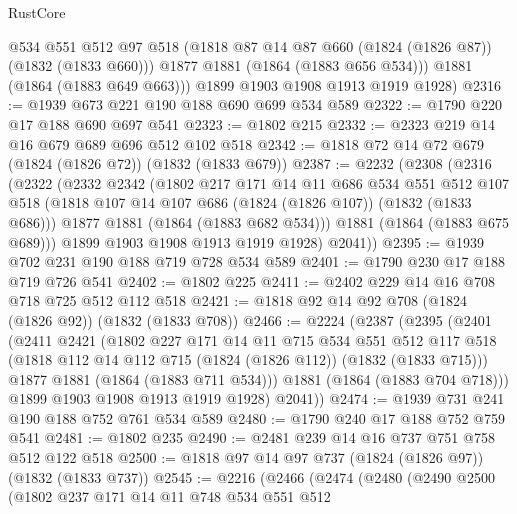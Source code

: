 \begin{lexlean}{RustCore}
\begin{coremodule}
          @534
          @551
          @512
          @97
          @518
          (@1818 @87 @14 @87 @660 (@1824 (@1826 @87)) (@1832 (@1833 @660)))
          @1877
          @1881
          (@1864 (@1883 @656 @534)))
        @1881
        (@1864 (@1883 @649 @663)))
      @1899
      @1903
      @1908
      @1913
      @1919
      @1928)
@2316 := @1939 @673 @221 @190 @188 @690 @699 @534 @589
@2322 := @1790 @220 @17 @188 @690 @697 @541
@2323 := @1802 @215
@2332 := @2323 @219 @14 @16 @679 @689 @696 @512 @102 @518
@2342 := @1818 @72 @14 @72 @679 (@1824 (@1826 @72)) (@1832 (@1833 @679))
@2387 := @2232
    (@2308
      (@2316
        (@2322
          (@2332
            @2342
            (@1802
              @217
              @171
              @14
              @11
              @686
              @534
              @551
              @512
              @107
              @518
              (@1818 @107 @14 @107 @686 (@1824 (@1826 @107)) (@1832 (@1833 @686)))
              @1877
              @1881
              (@1864 (@1883 @682 @534)))
            @1881
            (@1864 (@1883 @675 @689)))
          @1899
          @1903
          @1908
          @1913
          @1919
          @1928)
        @2041))
@2395 := @1939 @702 @231 @190 @188 @719 @728 @534 @589
@2401 := @1790 @230 @17 @188 @719 @726 @541
@2402 := @1802 @225
@2411 := @2402 @229 @14 @16 @708 @718 @725 @512 @112 @518
@2421 := @1818 @92 @14 @92 @708 (@1824 (@1826 @92)) (@1832 (@1833 @708))
@2466 := @2224
    (@2387
      (@2395
        (@2401
          (@2411
            @2421
            (@1802
              @227
              @171
              @14
              @11
              @715
              @534
              @551
              @512
              @117
              @518
              (@1818 @112 @14 @112 @715 (@1824 (@1826 @112)) (@1832 (@1833 @715)))
              @1877
              @1881
              (@1864 (@1883 @711 @534)))
            @1881
            (@1864 (@1883 @704 @718)))
          @1899
          @1903
          @1908
          @1913
          @1919
          @1928)
        @2041))
@2474 := @1939 @731 @241 @190 @188 @752 @761 @534 @589
@2480 := @1790 @240 @17 @188 @752 @759 @541
@2481 := @1802 @235
@2490 := @2481 @239 @14 @16 @737 @751 @758 @512 @122 @518
@2500 := @1818 @97 @14 @97 @737 (@1824 (@1826 @97)) (@1832 (@1833 @737))
@2545 := @2216
    (@2466
      (@2474
        (@2480
          (@2490
            @2500
            (@1802
              @237
              @171
              @14
              @11
              @748
              @534
              @551
              @512

\end{coremodule}
\end{lexlean}
